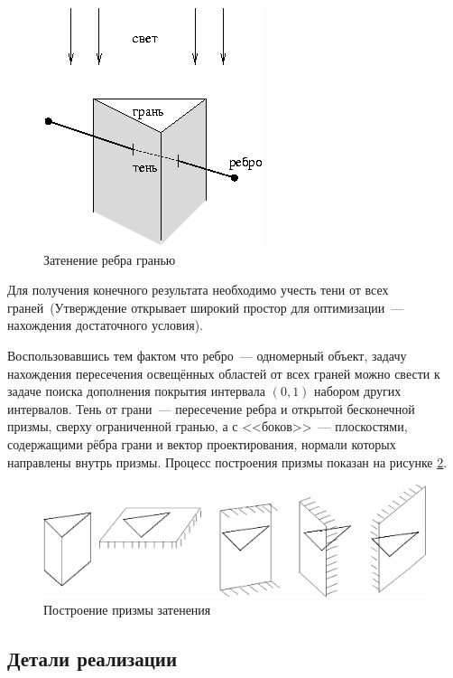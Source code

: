 \begin{figure}[ht!]
\begin{center}
\includegraphics[scale=1]{images/pol_shad.png}
\caption{Затенение ребра гранью} \label{fig:poly_shadow}
\end{center}
\end{figure}

Для получения конечного результата необходимо учесть тени от всех граней~(Утверждение открывает широкий простор для оптимизации~--- нахождения достаточного условия). 

Воспользовавшись тем фактом что ребро~--- одномерный объект, задачу нахождения пересечения освещённых областей от всех граней можно свести к задаче поиска дополнения покрытия интервала $(0,1)$ набором других интервалов. Тень от грани~--- пересечение ребра и открытой бесконечной призмы, сверху ограниченной гранью, а с <<боков>>~--- плоскостями, содержащими рёбра грани и вектор проектирования, нормали которых направлены внутрь призмы. Процесс построения призмы показан на рисунке \ref{fig:poly_prism}.

\begin{figure}[ht!]
\begin{center}
\includegraphics[scale=0.6]{images/pol_prism.png}
\caption{Построение призмы затенения} \label{fig:poly_prism}
\end{center}
\end{figure}

\subsection{Детали реализации}

